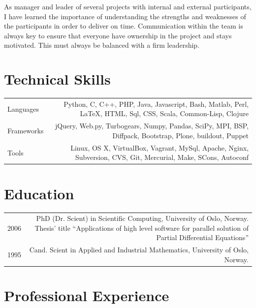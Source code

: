 \documentclass[english,a4paper,11pt]{article}
\begin{document}
As manager and leader of several projects with internal and external
participants, I have learned the importance of understanding the strengths and
weaknesses of the participants in order to deliver on time. Communication within
the team is always key to ensure that everyone have ownership in the project and
stays motivated. This must always be balanced with a firm leadership.

\section*{Technical Skills}

\begin{tabular}{LR}
Languages & Python, C, C++, PHP, Java, Javascript, Bash, Matlab, Perl,
LaTeX, HTML, Sql, CSS, Scala, Common-Lisp, Clojure \\

Frameworks & jQuery, Web.py, Turbogears, Numpy, Pandas, SciPy, MPI, BSP,
Diffpack, Bootstrap, Plone, buildout, Puppet \\

Tools & Linux, OS X, VirtualBox, Vagrant, MySql, Apache, Nginx, Subversion, CVS,
Git, Mercurial, Make, SCons, Autoconf \\
\end{tabular}

\section*{Education}
\begin{tabular}{LR}
2006 & PhD (Dr. Scient) in Scientific Computing, 
University of Oslo, Norway. Thesis' title ``Applications of high level software
for parallel solution of Partial Differential Equations'' \\
1995 & Cand. Scient in Applied and Industrial Mathematics, University of
Oslo, Norway.
\end{tabular}


\section*{Professional Experience}
\end{document}
